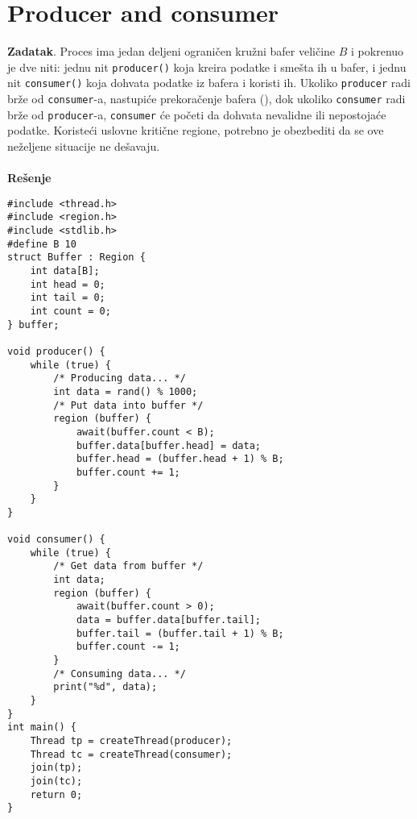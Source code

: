 \clearpage
\section{\latin Producer and consumer}
\textbf{\large Zadatak}. Proces ima jedan deljeni ograni\v{c}en kru\v{z}ni bafer veli\v{c}ine $B$ i pokrenuo je dve niti: jednu nit \texttt{producer()} koja kreira podatke i sme\v{s}ta ih u bafer, i jednu nit \texttt{consumer()} koja dohvata podatke iz bafera i koristi ih. Ukoliko \texttt{producer} radi br\v{z}e od \texttt{consumer}-a, nastupi\'{c}e prekora\v{c}enje bafera (), dok ukoliko \texttt{consumer} radi br\v{z}e od \texttt{producer}-a, \texttt{consumer} \'{c}e po\v{c}eti da dohvata nevalidne ili nepostoja\'{c}e podatke. Koriste\'{c}i uslovne kriti\v{c}ne regione, potrebno je obezbediti da se ove ne\v{z}eljene situacije ne de\v{s}avaju.
\\\\
\textbf{\large Re\v{s}enje}
\begin{lstlisting}
#include <thread.h>
#include <region.h>
#include <stdlib.h>
#define B 10
struct Buffer : Region {
    int data[B];
    int head = 0;
    int tail = 0;
    int count = 0;
} buffer;

void producer() {
    while (true) {
		/* Producing data... */
        int data = rand() % 1000;		
		/* Put data into buffer */
        region (buffer) {
            await(buffer.count < B);
            buffer.data[buffer.head] = data;
            buffer.head = (buffer.head + 1) % B;
            buffer.count += 1;
        }
    }
}

void consumer() {
    while (true) {
		/* Get data from buffer */
        int data;
        region (buffer) {
            await(buffer.count > 0);
            data = buffer.data[buffer.tail];
            buffer.tail = (buffer.tail + 1) % B;
            buffer.count -= 1;
        }
		/* Consuming data... */
        print("%d", data);
    }
}
int main() {
    Thread tp = createThread(producer);
    Thread tc = createThread(consumer);
    join(tp);
    join(tc);
    return 0;
}

\end{lstlisting}